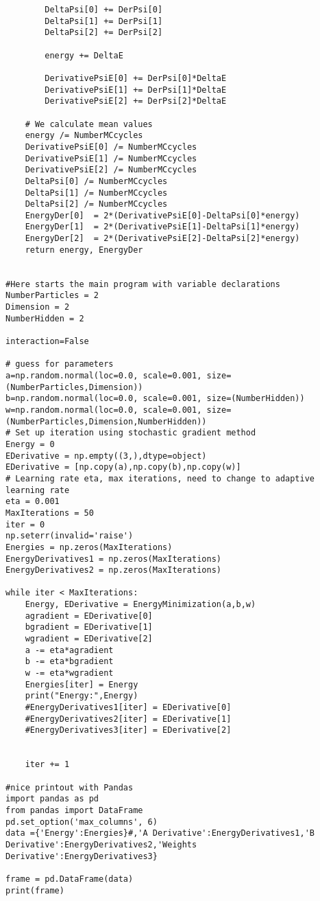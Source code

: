 \documentclass[%
oneside,                 %
final,                   %
10pt]{article}
\begin{document}
\begin{verbatim}
        DeltaPsi[0] += DerPsi[0]
        DeltaPsi[1] += DerPsi[1]
        DeltaPsi[2] += DerPsi[2]
        
        energy += DeltaE

        DerivativePsiE[0] += DerPsi[0]*DeltaE
        DerivativePsiE[1] += DerPsi[1]*DeltaE
        DerivativePsiE[2] += DerPsi[2]*DeltaE
            
    # We calculate mean values
    energy /= NumberMCcycles
    DerivativePsiE[0] /= NumberMCcycles
    DerivativePsiE[1] /= NumberMCcycles
    DerivativePsiE[2] /= NumberMCcycles
    DeltaPsi[0] /= NumberMCcycles
    DeltaPsi[1] /= NumberMCcycles
    DeltaPsi[2] /= NumberMCcycles
    EnergyDer[0]  = 2*(DerivativePsiE[0]-DeltaPsi[0]*energy)
    EnergyDer[1]  = 2*(DerivativePsiE[1]-DeltaPsi[1]*energy)
    EnergyDer[2]  = 2*(DerivativePsiE[2]-DeltaPsi[2]*energy)
    return energy, EnergyDer


#Here starts the main program with variable declarations
NumberParticles = 2
Dimension = 2
NumberHidden = 2

interaction=False

# guess for parameters
a=np.random.normal(loc=0.0, scale=0.001, size=(NumberParticles,Dimension))
b=np.random.normal(loc=0.0, scale=0.001, size=(NumberHidden))
w=np.random.normal(loc=0.0, scale=0.001, size=(NumberParticles,Dimension,NumberHidden))
# Set up iteration using stochastic gradient method
Energy = 0
EDerivative = np.empty((3,),dtype=object)
EDerivative = [np.copy(a),np.copy(b),np.copy(w)]
# Learning rate eta, max iterations, need to change to adaptive learning rate
eta = 0.001
MaxIterations = 50
iter = 0
np.seterr(invalid='raise')
Energies = np.zeros(MaxIterations)
EnergyDerivatives1 = np.zeros(MaxIterations)
EnergyDerivatives2 = np.zeros(MaxIterations)

while iter < MaxIterations:
    Energy, EDerivative = EnergyMinimization(a,b,w)
    agradient = EDerivative[0]
    bgradient = EDerivative[1]
    wgradient = EDerivative[2]
    a -= eta*agradient
    b -= eta*bgradient 
    w -= eta*wgradient 
    Energies[iter] = Energy
    print("Energy:",Energy)
    #EnergyDerivatives1[iter] = EDerivative[0] 
    #EnergyDerivatives2[iter] = EDerivative[1]
    #EnergyDerivatives3[iter] = EDerivative[2] 


    iter += 1

#nice printout with Pandas
import pandas as pd
from pandas import DataFrame
pd.set_option('max_columns', 6)
data ={'Energy':Energies}#,'A Derivative':EnergyDerivatives1,'B Derivative':EnergyDerivatives2,'Weights Derivative':EnergyDerivatives3}

frame = pd.DataFrame(data)
print(frame)

\end{verbatim}



\end{document}
